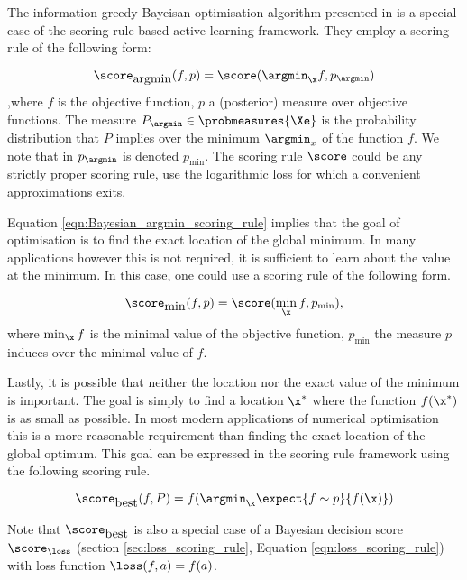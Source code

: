 The information-greedy Bayeisan optimisation algorithm presented in \citep{Hennig2012entropy} is a special case of the scoring-rule-based active learning framework. They employ a scoring rule of the following form:

\begin{equation}
	\score_{\mbox{argmin}}(f,p) = \score(\argmin_{\x}f,p_{\argmin}) \label{eqn:Bayesian_argmin_scoring_rule}
\end{equation}
,where $f$ is the objective function, $p$ a (posterior) measure over objective functions. The measure $P_{\argmin} \in \probmeasures{\Xe}$ is the probability distribution that $P$ implies over the minimum $\argmin_{x}$ of the function $f$. We note that in \citep{Hennig2012entropy} $p_{\argmin}$ is denoted $p_{\min}$. The scoring rule $\score$ could be any strictly proper scoring rule, \citet{Hennig2012entropy} use the logarithmic loss for which a convenient approximations exits.

Equation \eqref{eqn:Bayesian_argmin_scoring_rule} implies that the goal of optimisation is to find the exact location of the global minimum. In many applications however this is not required, it is sufficient to learn about the value at the minimum. In this case, one could use a scoring rule of the following form.


\begin{equation}
	\score_{\mbox{min}}(f,p) = \score(\min_{\x}f,p_{\min}), \label{eqn:Bayesian_argmin_scoring_rule}
\end{equation}
where $\min_{\x}f$ is the minimal value of the objective function, $p_{\min}$ the measure $p$ induces over the minimal value of $f$.

Lastly, it is possible that neither the location nor the exact value of the minimum is important. The goal is simply to find a location $\x^{*}$ where the function $f(\x^{*})$ is as small as possible. In most modern applications of numerical optimisation this is a more reasonable requirement than finding the exact location of the global optimum. This goal can be expressed in the scoring rule framework using the following scoring rule.

\begin{equation}
	\score_{\mbox{best}}(f,P) = f(\argmin_{\x}\expect{f\sim p}{f(\x)}) \label{eqn:Bayesian_optimisation_scoring_rule}
\end{equation}

Note that $\score_{\mbox{best}}$ is also a special case of a Bayesian decision score $\score_{\loss}$ (section \ref{sec:loss_scoring_rule}, Equation \eqref{eqn:loss_scoring_rule}) with loss function $\loss(f,a)=f(a)$.


